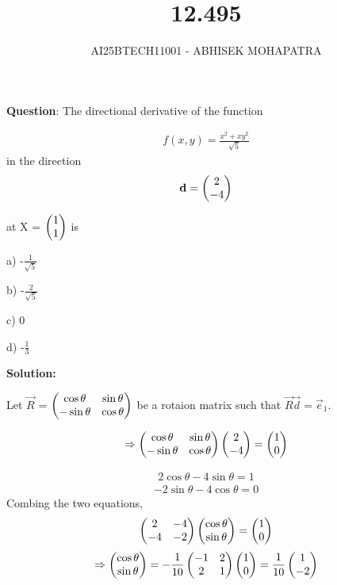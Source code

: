\documentclass{beamer}
\title{12.495}
\author{AI25BTECH11001 - ABHISEK MOHAPATRA}
\numberwithin{equation}{section}
\begin{document}
{\let\newpage\relax\maketitle}
\renewcommand{\thefigure}{\theenumi}
\renewcommand{\thetable}{\theenumi}


	 	\textbf{Question}:
The directional derivative of the function

\begin{align}
		f(x, y) =\frac{x^2 + xy^2}{\sqrt{5}}
\end{align}
in the direction
\begin{align}
		\mathbf{d} = \begin{pmatrix}2\\-4\end{pmatrix}
\end{align}

at X = $\begin{pmatrix}1\\ 1\end{pmatrix}$ is

a) -$\frac{1}{\sqrt{5}}$

b) -$\frac{2}{\sqrt{5}}$

c) 0

d) -$\frac{1}{3}$

		\textbf{Solution:}

Let $\vec{R}$ = $\begin{pmatrix}\cos{\theta}&\sin{\theta}\\-\sin{\theta}&\cos{\theta}\end{pmatrix}$ be a rotaion matrix such that $\vec{R}\vec{d} = \vec{e}_1$.


\begin{align}
		\Rightarrow\begin{pmatrix}\cos{\theta}&\sin{\theta}\\-\sin{\theta}&\cos{\theta}\end{pmatrix} \begin{pmatrix}2\\-4\end{pmatrix} = \begin{pmatrix}1\\0\end{pmatrix}
\end{align}

\begin{align}
		2\cos{\theta} - 4\sin{\theta} = 1
\end{align}
\begin{align}
		-2\sin{\theta} - 4\cos{\theta} = 0
\end{align}
Combing the two equations,
\begin{align}
		\begin{pmatrix}2 &- 4\\-4&-2\end{pmatrix}\begin{pmatrix}\cos{\theta}\\\sin{\theta}\end{pmatrix} = \begin{pmatrix}1\\0\end{pmatrix}
\end{align}
\begin{align}
	\Rightarrow	\begin{pmatrix}\cos{\theta}\\\sin{\theta}\end{pmatrix} = -\frac{1}{10}\begin{pmatrix}-1&2\\2&1\end{pmatrix}\begin{pmatrix}1\\0\end{pmatrix} = \frac{1}{10}\begin{pmatrix}1\\-2\end{pmatrix}
\end{align}
\end{document}
